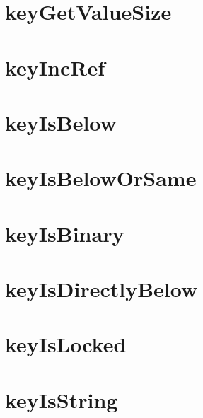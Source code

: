 \let\mypdfximage\pdfximage\def\pdfximage{\immediate\mypdfximage}\documentclass[twoside]{book}
\newcommand{\+}{\discretionary{\mbox{\scriptsize$\hookleftarrow$}}{}{}}
\begin{document}
\chapter{key\+Get\+Value\+Size}
\label{doc_api_review_core_keyGetValueSize_md}

\chapter{key\+Inc\+Ref}
\label{doc_api_review_core_keyIncRef_md}

\chapter{key\+Is\+Below}
\label{doc_api_review_core_keyIsBelow_md}

\chapter{key\+Is\+Below\+Or\+Same}
\label{doc_api_review_core_keyIsBelowOrSame_md}

\chapter{key\+Is\+Binary}
\label{doc_api_review_core_keyIsBinary_md}

\chapter{key\+Is\+Directly\+Below}
\label{doc_api_review_core_keyIsDirectlyBelow_md}

\chapter{key\+Is\+Locked}
\label{doc_api_review_core_keyIsLocked_md}

\chapter{key\+Is\+String}
\label{doc_api_review_core_keyIsString_md}

\end{document}
